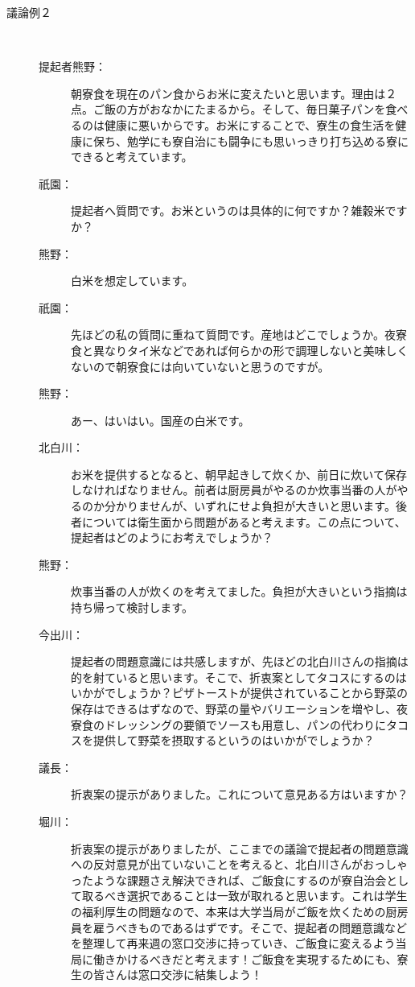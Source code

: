 \begin{description}
  \item[議論例２]\mbox{}\\
  \begin{description}
\item[提起者熊野：]朝寮食を現在のパン食からお米に変えたいと思います。理由は２点。ご飯の方がおなかにたまるから。そして、毎日菓子パンを食べるのは健康に悪いからです。お米にすることで、寮生の食生活を健康に保ち、勉学にも寮自治にも闘争にも思いっきり打ち込める寮にできると考えています。
\item[祇園：]提起者へ質問です。お米というのは具体的に何ですか？雑穀米ですか？
\item[熊野：]白米を想定しています。
\item[祇園：]先ほどの私の質問に重ねて質問です。産地はどこでしょうか。夜寮食と異なりタイ米などであれば何らかの形で調理しないと美味しくないので朝寮食には向いていないと思うのですが。
\item[熊野：]あー、はいはい。国産の白米です。
\item[北白川：]お米を提供するとなると、朝早起きして炊くか、前日に炊いて保存しなければなりません。前者は厨房員がやるのか炊事当番の人がやるのか分かりませんが、いずれにせよ負担が大きいと思います。後者については衛生面から問題があると考えます。この点について、提起者はどのようにお考えでしょうか？
\item[熊野：]炊事当番の人が炊くのを考えてました。負担が大きいという指摘は持ち帰って検討します。
\item[今出川：]提起者の問題意識には共感しますが、先ほどの北白川さんの指摘は的を射ていると思います。そこで、折衷案としてタコスにするのはいかがでしょうか？ピザトーストが提供されていることから野菜の保存はできるはずなので、野菜の量やバリエーションを増やし、夜寮食のドレッシングの要領でソースも用意し、パンの代わりにタコスを提供して野菜を摂取するというのはいかがでしょうか？
\item[議長：]折衷案の提示がありました。これについて意見ある方はいますか？
\item[堀川：]折衷案の提示がありましたが、ここまでの議論で提起者の問題意識への反対意見が出ていないことを考えると、北白川さんがおっしゃったような課題さえ解決できれば、ご飯食にするのが寮自治会として取るべき選択であることは一致が取れると思います。これは学生の福利厚生の問題なので、本来は大学当局がご飯を炊くための厨房員を雇うべきものであるはずです。そこで、提起者の問題意識などを整理して再来週の窓口交渉に持っていき、ご飯食に変えるよう当局に働きかけるべきだと考えます！ご飯食を実現するためにも、寮生の皆さんは窓口交渉に結集しよう！

\end{description}
\end{description}
